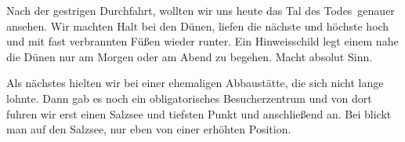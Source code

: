 Nach der gestrigen Durchfahrt, wollten wir uns heute das \flqq Tal des Todes\frqq\, genauer ansehen.
Wir machten Halt bei den Dünen, liefen die nächste und höchste hoch und mit fast verbrannten Füßen wieder runter.
Ein Hinweisschild legt einem nahe die Dünen nur am Morgen oder am Abend zu begehen.
Macht absolut Sinn.

Als nächstes hielten wir bei einer ehemaligen Abbaustätte, die sich nicht lange lohnte.
Dann gab es noch ein obligatorisches Besucherzentrum und von dort fuhren wir erst einen Salzsee und tiefsten Punkt  und anschließend  an.
Bei  blickt man auf den Salzsee, nur eben von einer erhöhten Position.

\thispagestyle{empty}
\newpage

\thispagestyle{empty}
\newpage

